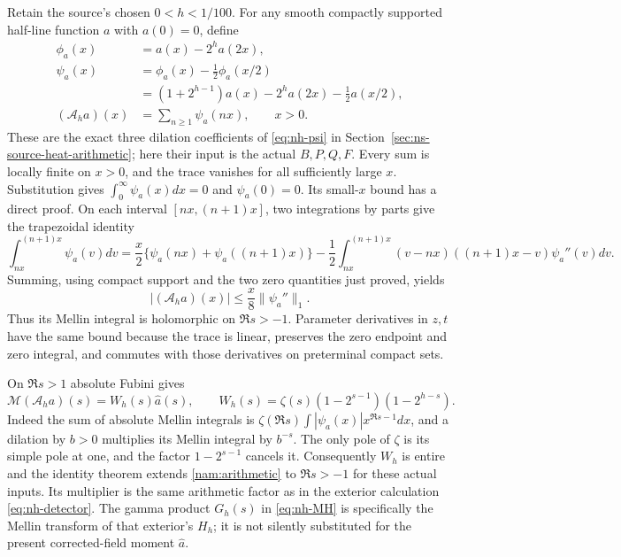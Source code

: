 Retain the source's chosen $0<h<1/100$. For any smooth compactly
supported half-line function $a$ with $a(0)=0$, define
\begin{align*}
 \phi_a(x)&=a(x)-2^h a(2x),\\
 \psi_a(x)&=\phi_a(x)-\tfrac12\phi_a(x/2)\\
  &=(1+2^{h-1})a(x)-2^ha(2x)-\tfrac12a(x/2),\\
 (\mathcal A_h a)(x)&=\sum_{n\geq1}\psi_a(nx),\qquad x>0.
\end{align*}
These are the exact three dilation coefficients of
\eqref{eq:nh-psi} in Section~\ref{sec:ns-source-heat-arithmetic};
here their input is the actual $B,P,Q,F$.
Every sum is locally finite on $x>0$, and the trace vanishes for all
sufficiently large $x$. Substitution gives
$\int_0^\infty\psi_a(x)dx=0$ and $\psi_a(0)=0$.
Its small-$x$ bound has a direct proof. On each interval $[nx,(n+1)x]$,
two integrations by parts give the trapezoidal identity
\[
 \int_{nx}^{(n+1)x}\psi_a(v)dv
 =\frac{x}{2}\{\psi_a(nx)+\psi_a((n+1)x)\}
 -\frac12\int_{nx}^{(n+1)x}
             (v-nx)((n+1)x-v)\psi_a''(v)dv.
\]
Summing, using compact support and the two zero quantities just
proved, yields
\begin{equation}
 |(\mathcal A_h a)(x)|\leq\frac{x}{8}\|\psi_a''\|_1.
 \label{nam:tracebound}
\end{equation}
Thus its Mellin integral is holomorphic on $\Re s>-1$.
Parameter derivatives in $z,t$ have the same bound because the trace
is linear, preserves the zero endpoint and zero integral, and commutes
with those derivatives on preterminal compact sets.

On $\Re s>1$ absolute Fubini gives
\begin{equation}
 \mathcal M(\mathcal A_h a)(s)
    =W_h(s)\widehat a(s),\qquad
 W_h(s)=\zeta(s)(1-2^{s-1})(1-2^{h-s}).
 \label{nam:arithmetic}
\end{equation}
Indeed the sum of absolute Mellin integrals is
$\zeta(\Re s)\int|\psi_a(x)|x^{\Re s-1}dx$, and a dilation by
$b>0$ multiplies its Mellin integral by $b^{-s}$.
The only pole of $\zeta$ is its simple pole at one, and the factor
$1-2^{s-1}$ cancels it. Consequently $W_h$ is entire and the identity
theorem extends \eqref{nam:arithmetic} to $\Re s>-1$ for these
actual inputs. Its multiplier is the same arithmetic factor as in the
exterior calculation \eqref{eq:nh-detector}. The gamma product
$G_h(s)$ in \eqref{eq:nh-MH} is specifically the Mellin transform of
that exterior's $H_h$; it is not silently substituted for the present
corrected-field moment $\widehat a$.


